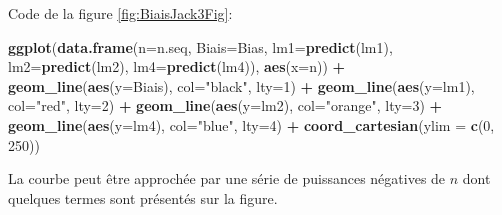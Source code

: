 \documentclass[
  11pt,
  french,
  a4paper,
  extrafontsizes,onecolumn,openright
  ]{memoir}
\newenvironment{Shaded}{\begin{snugshade}}{\end{snugshade}}
\newcommand{\AttributeTok}[1]{\textcolor[rgb]{0.13,0.29,0.53}{#1}}
\newcommand{\DecValTok}[1]{\textcolor[rgb]{0.00,0.00,0.81}{#1}}
\newcommand{\FunctionTok}[1]{\textcolor[rgb]{0.13,0.29,0.53}{\textbf{#1}}}
\newcommand{\NormalTok}[1]{#1}
\newcommand{\SpecialCharTok}[1]{\textcolor[rgb]{0.81,0.36,0.00}{\textbf{#1}}}
\newcommand{\StringTok}[1]{\textcolor[rgb]{0.31,0.60,0.02}{#1}}
\begin{document}
Code de la figure \ref{fig:BiaisJack3Fig}:

\scriptsize

\begin{Shaded}
\begin{Highlighting}[]
\FunctionTok{ggplot}\NormalTok{(}\FunctionTok{data.frame}\NormalTok{(}\AttributeTok{n=}\NormalTok{n.seq, }\AttributeTok{Biais=}\NormalTok{Bias, }\AttributeTok{lm1=}\FunctionTok{predict}\NormalTok{(lm1), }
        \AttributeTok{lm2=}\FunctionTok{predict}\NormalTok{(lm2), }\AttributeTok{lm4=}\FunctionTok{predict}\NormalTok{(lm4)), }\FunctionTok{aes}\NormalTok{(}\AttributeTok{x=}\NormalTok{n)) }\SpecialCharTok{+}
  \FunctionTok{geom\_line}\NormalTok{(}\FunctionTok{aes}\NormalTok{(}\AttributeTok{y=}\NormalTok{Biais), }\AttributeTok{col=}\StringTok{"black"}\NormalTok{, }\AttributeTok{lty=}\DecValTok{1}\NormalTok{) }\SpecialCharTok{+}
  \FunctionTok{geom\_line}\NormalTok{(}\FunctionTok{aes}\NormalTok{(}\AttributeTok{y=}\NormalTok{lm1), }\AttributeTok{col=}\StringTok{"red"}\NormalTok{, }\AttributeTok{lty=}\DecValTok{2}\NormalTok{) }\SpecialCharTok{+}
  \FunctionTok{geom\_line}\NormalTok{(}\FunctionTok{aes}\NormalTok{(}\AttributeTok{y=}\NormalTok{lm2), }\AttributeTok{col=}\StringTok{"orange"}\NormalTok{, }\AttributeTok{lty=}\DecValTok{3}\NormalTok{) }\SpecialCharTok{+}
  \FunctionTok{geom\_line}\NormalTok{(}\FunctionTok{aes}\NormalTok{(}\AttributeTok{y=}\NormalTok{lm4), }\AttributeTok{col=}\StringTok{"blue"}\NormalTok{, }\AttributeTok{lty=}\DecValTok{4}\NormalTok{) }\SpecialCharTok{+}
  \FunctionTok{coord\_cartesian}\NormalTok{(}\AttributeTok{ylim =} \FunctionTok{c}\NormalTok{(}\DecValTok{0}\NormalTok{, }\DecValTok{250}\NormalTok{))}
\end{Highlighting}
\end{Shaded}

\normalsize

La courbe peut être approchée par une série de puissances négatives de \(n\) dont quelques termes sont présentés sur la figure.

\scriptsize
\end{document}
